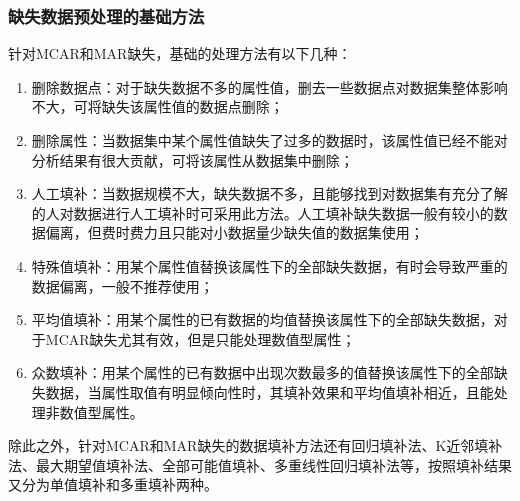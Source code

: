 \documentclass[a4paper]{ctexart}
\begin{document}
\subsubsection{缺失数据预处理的基础方法}
针对MCAR和MAR缺失，基础的处理方法有以下几种\cite{RN166}：
\begin{enumerate}[label=(\arabic*)]
	\item 删除数据点：对于缺失数据不多的属性值，删去一些数据点对数据集整体影响不大，可将缺失该属性值的数据点删除；
	\item 删除属性：当数据集中某个属性值缺失了过多的数据时，该属性值已经不能对分析结果有很大贡献，可将该属性从数据集中删除；
	\item 人工填补：当数据规模不大，缺失数据不多，且能够找到对数据集有充分了解的人对数据进行人工填补时可采用此方法。人工填补缺失数据一般有较小的数据偏离，但费时费力且只能对小数据量少缺失值的数据集使用；
	\item 特殊值填补：用某个属性值替换该属性下的全部缺失数据，有时会导致严重的数据偏离，一般不推荐使用；
	\item 平均值填补：用某个属性的已有数据的均值替换该属性下的全部缺失数据，对于MCAR缺失尤其有效，但是只能处理数值型属性；
	\item 众数填补：用某个属性的已有数据中出现次数最多的值替换该属性下的全部缺失数据，当属性取值有明显倾向性时，其填补效果和平均值填补相近，且能处理非数值型属性。
\end{enumerate}
除此之外，针对MCAR和MAR缺失的数据填补方法还有回归填补法、K近邻填补法、最大期望值填补法、全部可能值填补、多重线性回归填补法等，按照填补结果又分为单值填补和多重填补两种。
\end{document}
